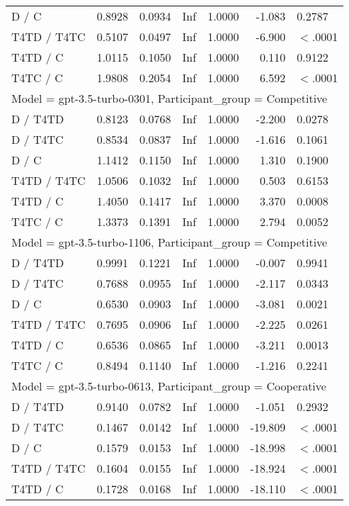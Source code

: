 \begin{table}[ht]
\begin{tabular}{lrrrrrl}
  D / C & 0.8928 & 0.0934 & Inf & 1.0000 & -1.083 & 0.2787 \\ 
  T4TD / T4TC & 0.5107 & 0.0497 & Inf & 1.0000 & -6.900 & $<$.0001 \\ 
  T4TD / C & 1.0115 & 0.1050 & Inf & 1.0000 & 0.110 & 0.9122 \\ 
  T4TC / C & 1.9808 & 0.2054 & Inf & 1.0000 & 6.592 & $<$.0001 \\ 
   \hline
\multicolumn{7}{l}{Model = gpt-3.5-turbo-0301, Participant_group = Competitive}\\
D / T4TD & 0.8123 & 0.0768 & Inf & 1.0000 & -2.200 & 0.0278 \\ 
  D / T4TC & 0.8534 & 0.0837 & Inf & 1.0000 & -1.616 & 0.1061 \\ 
  D / C & 1.1412 & 0.1150 & Inf & 1.0000 & 1.310 & 0.1900 \\ 
  T4TD / T4TC & 1.0506 & 0.1032 & Inf & 1.0000 & 0.503 & 0.6153 \\ 
  T4TD / C & 1.4050 & 0.1417 & Inf & 1.0000 & 3.370 & 0.0008 \\ 
  T4TC / C & 1.3373 & 0.1391 & Inf & 1.0000 & 2.794 & 0.0052 \\ 
   \hline
\multicolumn{7}{l}{Model = gpt-3.5-turbo-1106, Participant_group = Competitive}\\
D / T4TD & 0.9991 & 0.1221 & Inf & 1.0000 & -0.007 & 0.9941 \\ 
  D / T4TC & 0.7688 & 0.0955 & Inf & 1.0000 & -2.117 & 0.0343 \\ 
  D / C & 0.6530 & 0.0903 & Inf & 1.0000 & -3.081 & 0.0021 \\ 
  T4TD / T4TC & 0.7695 & 0.0906 & Inf & 1.0000 & -2.225 & 0.0261 \\ 
  T4TD / C & 0.6536 & 0.0865 & Inf & 1.0000 & -3.211 & 0.0013 \\ 
  T4TC / C & 0.8494 & 0.1140 & Inf & 1.0000 & -1.216 & 0.2241 \\ 
   \hline
\multicolumn{7}{l}{Model = gpt-3.5-turbo-0613, Participant_group = Cooperative}\\
D / T4TD & 0.9140 & 0.0782 & Inf & 1.0000 & -1.051 & 0.2932 \\ 
  D / T4TC & 0.1467 & 0.0142 & Inf & 1.0000 & -19.809 & $<$.0001 \\ 
  D / C & 0.1579 & 0.0153 & Inf & 1.0000 & -18.998 & $<$.0001 \\ 
  T4TD / T4TC & 0.1604 & 0.0155 & Inf & 1.0000 & -18.924 & $<$.0001 \\ 
  T4TD / C & 0.1728 & 0.0168 & Inf & 1.0000 & -18.110 & $<$.0001 \\ 

\end{tabular}
\end{table}

